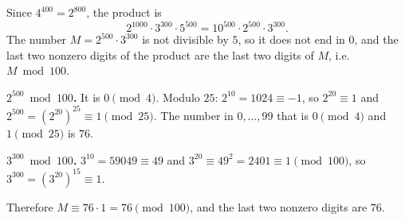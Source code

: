 Since $4^{400}=2^{800}$, the product is
\[
2^{1000}\cdot3^{300}\cdot5^{500}=10^{500}\cdot2^{500}\cdot3^{300}.
\]
The number $M=2^{500}\cdot3^{300}$ is not divisible by $5$, so it does not end in $0$, and the last two nonzero digits of the product are the last two digits of $M$, i.e.\ $M\bmod100$.

\textbf{$2^{500}\bmod100$.} It is $0\pmod4$. Modulo $25$: $2^{10}=1024\equiv-1$, so $2^{20}\equiv1$ and $2^{500}=\left(2^{20}\right)^{25}\equiv1\pmod{25}$. The number in $0,\dots,99$ that is $0\pmod4$ and $1\pmod{25}$ is $76$.

\textbf{$3^{300}\bmod100$.} $3^{10}=59049\equiv49$ and $3^{20}\equiv49^2=2401\equiv1\pmod{100}$, so $3^{300}=\left(3^{20}\right)^{15}\equiv1$.

Therefore $M\equiv76\cdot1=76\pmod{100}$, and the last two nonzero digits are $\boxed{76}$.
